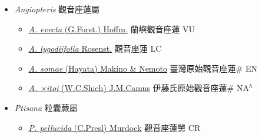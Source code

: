
  \begin{itemize}
 \item[] \textit{Angiopteris} 觀音座蓮屬
                    
  \begin{itemize}
        \item[] \href{http://www.theplantlist.org/tpl1.1/search?q=Angiopteris+evecta}{\textit{A. evecta} (G.Forst.) Hoffm.}     蘭嶼觀音座蓮 VU
        \item[] \href{http://www.theplantlist.org/tpl1.1/search?q=Angiopteris+lygodiifolia}{\textit{A. lygodiifolia} Rosenst.}   觀音座蓮 LC
        \item[] \href{http://www.theplantlist.org/tpl1.1/search?q=Angiopteris+somae}{\textit{A. somae} (Hayata) Makino \& Nemoto}     臺灣原始觀音座蓮\# EN
        \item[] \href{http://www.theplantlist.org/tpl1.1/search?q=Angiopteris+×itoi}{\textit{A. ×itoi} (W.C.Shieh) J.M.Camus}     伊藤氏原始觀音座蓮\# NA$^h$
  \end{itemize}
 \item[] \textit{Ptisana} 粒囊蕨屬
                    
  \begin{itemize}
        \item[] \href{http://www.theplantlist.org/tpl1.1/search?q=Ptisana+pellucida}{\textit{P. pellucida} (C.Presl) Murdock}     觀音座蓮舅 CR
  \end{itemize}
  \end{itemize}
